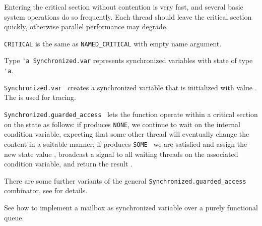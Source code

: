 \begin{isabellebody}
\begin{isamarkuptext}
\begin{description}
  Entering the critical section without contention is very fast, and
  several basic system operations do so frequently.  Each thread
  should leave the critical section quickly, otherwise parallel
  performance may degrade.

  \item \verb|CRITICAL| is the same as \verb|NAMED_CRITICAL| with empty
  name argument.

  \item Type \verb|'a Synchronized.var| represents synchronized
  variables with state of type \verb|'a|.

  \item \verb|Synchronized.var|~ creates a synchronized
  variable that is initialized with value .  The  is used for tracing.

  \item \verb|Synchronized.guarded_access|~ lets the
  function  operate within a critical section on the state
   as follows: if  produces \verb|NONE|, we
  continue to wait on the internal condition variable, expecting that
  some other thread will eventually change the content in a suitable
  manner; if  produces \verb|SOME|~ we
  are satisfied and assign the new state value , broadcast
  a signal to all waiting threads on the associated condition
  variable, and return the result .

  \end{description}

  There are some further variants of the general \verb|Synchronized.guarded_access| combinator, see \hyperlink{file.~~/src/Pure/Concurrent/synchronized.ML}{\mbox{}} for details.%
\end{isamarkuptext}%
\isamarkuptrue%
%
\endisatagmlref
{\isafoldmlref}%
%
\isadelimmlref
%
\endisadelimmlref
%
\isadelimmlex
%
\endisadelimmlex
%
\isatagmlex
%
\begin{isamarkuptext}%
See \hyperlink{file.~~/src/Pure/Concurrent/mailbox.ML}{\mbox{}} how to
  implement a mailbox as synchronized variable over a purely
  functional queue.


\end{isamarkuptext}
\end{isabellebody}

